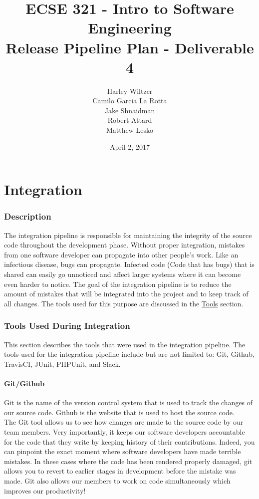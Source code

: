 \documentclass[12pt]{report}
\title{ECSE 321 - Intro to Software Engineering\\Release Pipeline Plan - Deliverable 4}
\author{Harley Wiltzer\\Camilo Garcia La Rotta\\Jake Shnaidman\\Robert Attard\\Matthew Lesko}
\date{April 2, 2017}
\begin{document}
\maketitle
\newpage
{} %
\tableofcontents
\part{Integration}
\section{Description}
The integration pipeline is responsible for maintaining the integrity of the source code throughout
the development phase. Without proper integration, mistakes from one software developer can
propagate into other people's work. Like an infectious disease, bugs can propagate. Infected code
(Code that has bugs) that is shared can easily go unnoticed and affect larger systems where it can
become even harder to notice. The goal of the integration pipeline is to reduce the amount of
mistakes that will be integrated into the project and to keep track of all changes. The tools used
for this purpose are discussed in the \hyperref[s:integration-tools]{Tools} section.

\section{Tools Used During Integration}
\label{s:integration-tools}
This section describes the tools that were used in the integration pipeline. The tools used for the integration pipeline include but are not limited to: Git, Github, TravisCI, JUnit, PHPUnit, and Slack.

\subsection{Git/Github}

Git is the name of the version control system that is used to track the changes of our source code. Github is the website that is used to host the source code. \\

The Git tool allows us to see how changes are made to the source code by our team members. Very
importantly, it keeps our software developers accountable for the code that they write by keeping
history of their contributions. Indeed, you can pinpoint the exact moment where software developers
have made terrible mistakes. In these cases where the code has been rendered properly damaged, git
allows you to revert to earlier stages in development before the mistake was made. Git also allows
our members to work on code simultaneously which improves our productivity!\\
\end{document}

